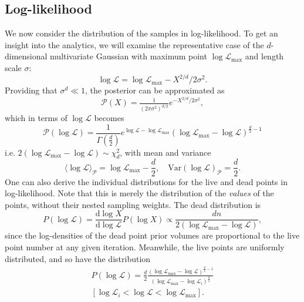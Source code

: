 \documentclass[usenatbib]{mnras}
\newcommand{\Like}{\mathcal{L}}
\newcommand{\logLmax}{\log \Like_\mathrm{max}}
\begin{document}
\subsection{Log-likelihood}\label{sec:logL}
We now consider the distribution of the samples in log-likelihood. To get an insight into the analytics, we will examine the representative case of the $d$-dimensional multivariate Gaussian with maximum point $\logLmax$ and length scale $\sigma$:
\begin{equation}\label{eq:gaussian_logL}
    \log \Like = \logLmax - X^{2/d}/2\sigma^2.
\end{equation}
Providing that $\sigma^d \ll 1$, the posterior can be approximated as 
\begin{equation}
    \mathcal{P}(X) = \tfrac{1}{(2\pi\sigma^2)^{d/2}} e^{-X^{2/d}/2\sigma^2}, 
    \label{eqn:PX}
\end{equation}
which in terms of $\log\mathcal{L}$ becomes
\begin{equation}
    \mathcal{P}(\log\mathcal{L}) = \frac{1}{\Gamma\left(\frac{d}{2}\right)}e^{\log\mathcal{L}-\log\mathcal{L}_\mathrm{max}} (\log\mathcal{L}_\mathrm{max}-\log\mathcal{L})^{\frac{d}{2}-1}
\end{equation}
i.e. $2(\log\mathcal{L}_\mathrm{max}-\log\mathcal{L}) \sim \chi^2_{d}$, with mean and variance
\begin{equation}
    \langle\log\mathcal{L}\rangle_\mathcal{P} = \log\mathcal{L}_\mathrm{max} - \frac{d}{2},  \quad \mathrm{Var}(\log\mathcal{L})_\mathcal{P} = \frac{d}{2}.
\end{equation}
One can also derive the individual distributions for the live and dead points in log-likelihood. Note that this is merely the distribution of the \textit{values} of the points, without their nested sampling weights. The dead distribution is
\begin{equation}
    P(\log\Like) = \frac{\mathrm{d} \log X}{\mathrm{d} \log\Like} P(\log X) \propto \frac{dn}{2(\logLmax - \log\Like)},
\end{equation}
since the log-densities of the dead point prior volumes are proportional to the live point number at any given iteration. Meanwhile, the live points are uniformly distributed, and so have the distribution 
\begin{multline}
	P(\log\mathcal{L}) = \frac{d}{2}\frac{(\log\mathcal{L}_\mathrm{max}-\log\mathcal{L})^{\frac{d}{2}-1}}{(\log\mathcal{L}_\mathrm{max}-\log\mathcal{L}_i)^{\frac{d}{2}}} \\
    [\log\mathcal{L}_i < \log\mathcal{L} <\log\mathcal{L}_\mathrm{max}].
    \label{eq:PL}
\end{multline}
\end{document}
